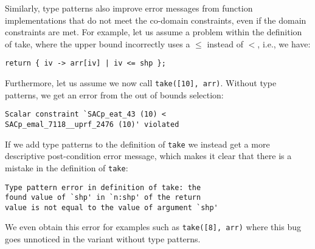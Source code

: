 \noindent
Similarly, type patterns also improve error messages from function implementations that do not meet the co-domain constraints, even if the domain constraints are met.
For example, let us assume a problem within the definition of take, where the upper bound incorrectly uses a $\leq$ instead of $<$, i.e., we have:
\begin{lstlisting}
return { iv -> arr[iv] | iv <= shp };
\end{lstlisting}

\noindent
Furthermore, let us assume we now call \verb|take([10], arr)|.
Without type patterns, we get an error from the out of bounds selection:
\begin{lstlisting}[language=console]
Scalar constraint `SACp_eat_43 (10) <
SACp_emal_7118__uprf_2476 (10)' violated
\end{lstlisting}

\noindent
If we add type patterns to the definition of \texttt{take} we instead get a more descriptive post-condition error message, which makes it clear that there is a mistake in the definition of \texttt{take}:
\begin{lstlisting}[language=console]
Type pattern error in definition of take: the
found value of `shp' in `n:shp' of the return
value is not equal to the value of argument `shp'
\end{lstlisting}

\noindent
We even obtain this error for examples such as \verb|take([8], arr)| where this bug goes unnoticed in the variant without type patterns.
